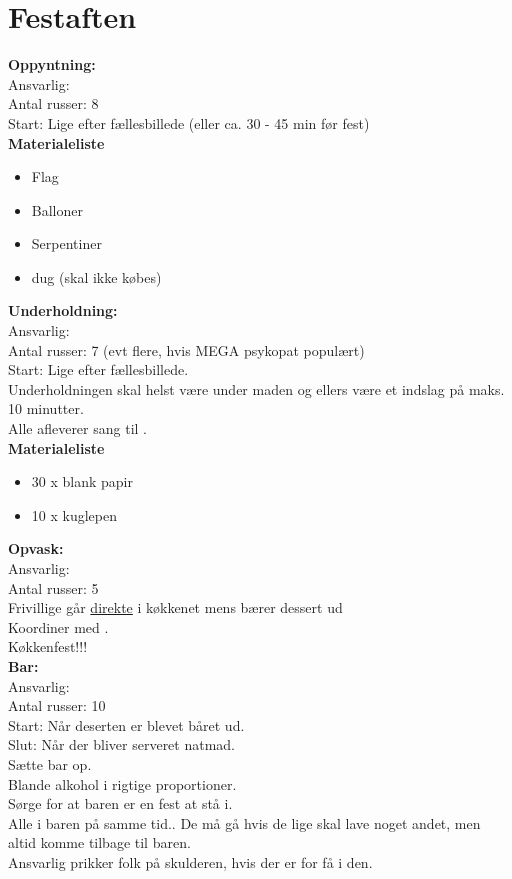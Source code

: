 \section{Festaften}

\textbf{Oppyntning:}\\
Ansvarlig: \BIATCH\\
Antal russer: 8\\
Start: Lige efter fællesbillede (eller ca. 30 - 45 min før fest)\\
\textbf{Materialeliste}
\begin{multicols}{2}
\begin{itemize}
 \item Flag
 \item Balloner
 \item Serpentiner
 \item dug (skal ikke købes)
\end{itemize}
\end{multicols}


\textbf{Underholdning:}\\
Ansvarlig: \Johnny\\
Antal russer: 7 (evt flere, hvis MEGA psykopat populært)\\
Start: Lige efter fællesbillede.\\
Underholdningen skal helst være under maden og ellers være et indslag på maks. 10 minutter.\\
Alle afleverer sang til \Johnny.\\
\textbf{Materialeliste}
\begin{multicols}{2}
\begin{itemize}
 \item 30 x blank papir
 \item 10 x kuglepen
\end{itemize}
\end{multicols}


\textbf{Opvask:}\\
Ansvarlig: \YOLO\\
Antal russer: 5\\
Frivillige går \underline{direkte} i køkkenet mens \Norder bærer dessert ud\\
Koordiner med \Hyttebombz.\\
Køkkenfest!!!\\


\textbf{Bar:}\\
Ansvarlig: \Gabriel\\
Antal russer: 10\\
Start: Når deserten er blevet båret ud.\\
Slut: Når der bliver serveret natmad.\\
Sætte bar op.\\
Blande alkohol i rigtige proportioner.\\
Sørge for at baren er en fest at stå i.\\
Alle i baren på samme tid.. De må gå hvis de lige skal lave noget andet, men altid komme tilbage til baren. \\
Ansvarlig prikker folk på skulderen, hvis der er for få i den.

